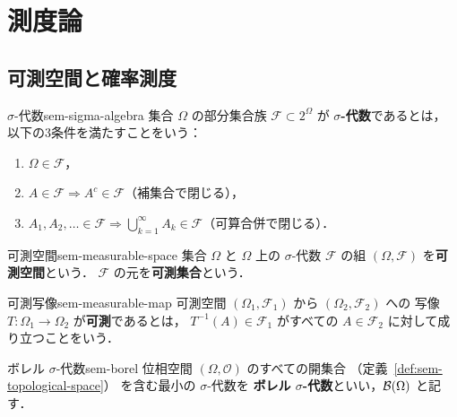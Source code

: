 \section{測度論}
\label{sec:sem-measure-theory}

\subsection{可測空間と確率測度}
\label{sec:sem-measurable}

\begin{definition}{$\sigma$-代数}{sem-sigma-algebra}
  集合 $\Omega$ の部分集合族 $\mathcal{F} \subset 2^{\Omega}$ が
  \textbf{$\sigma$-代数}であるとは，
  以下の3条件を満たすことをいう：
  \begin{enumerate}
    \item[(i)] $\Omega \in \mathcal{F}$，
    \item[(ii)] $A \in \mathcal{F} \Longrightarrow A^c \in \mathcal{F}$（補集合で閉じる），
    \item[(iii)] $A_1, A_2, \ldots \in \mathcal{F} \Longrightarrow
      \bigcup_{k=1}^{\infty} A_k \in \mathcal{F}$（可算合併で閉じる）．
  \end{enumerate}
\end{definition}

\begin{definition}{可測空間}{sem-measurable-space}
  集合 $\Omega$ と $\Omega$ 上の $\sigma$-代数 $\mathcal{F}$ の組
  $(\Omega, \mathcal{F})$ を\textbf{可測空間}という．
  $\mathcal{F}$ の元を\textbf{可測集合}という．
\end{definition}

\begin{definition}{可測写像}{sem-measurable-map}
  可測空間 $(\Omega_1, \mathcal{F}_1)$ から $(\Omega_2, \mathcal{F}_2)$ への
  写像 $T \colon \Omega_1 \to \Omega_2$ が\textbf{可測}であるとは，
  $T^{-1}(A) \in \mathcal{F}_1$ がすべての $A \in \mathcal{F}_2$ に対して成り立つことをいう．
\end{definition}

\begin{definition}{ボレル $\sigma$-代数}{sem-borel}
  位相空間 $(\Omega, \mathcal{O})$ のすべての開集合
  （定義~\ref{def:sem-topological-space}）
  を含む最小の $\sigma$-代数を
  \textbf{ボレル $\sigma$-代数}といい，$\mathcal{B}(\Omega)$ と記す．
\end{definition}

